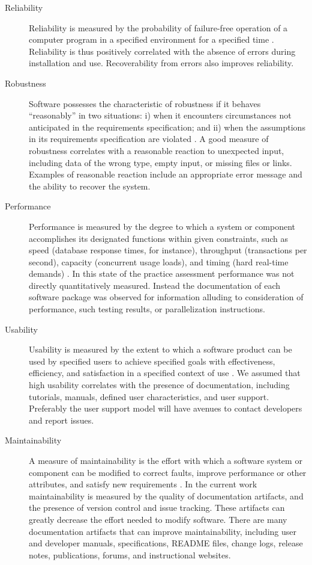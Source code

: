 \documentclass[final, 3p, times, authoryear]{elsarticle}
\begin{document}
\begin{description}
	\item[Reliability] Reliability is measured by the probability of
	failure-free operation of a computer program in a specified environment for
	a specified time \citep{GhezziEtAl2003, musa1987software}. Reliability is
	thus positively correlated with the absence of errors during installation
	and use. Recoverability from errors also improves reliability.
	
	\item[Robustness] Software possesses the characteristic of robustness if it
	behaves ``reasonably'' in two situations: i) when it encounters
	circumstances not anticipated in the requirements specification; and ii)
	when the assumptions in its requirements specification are violated
	\citep{boehm2007software, ghezzi1991fundamentals}. A good measure of
	robustness correlates with a reasonable reaction to unexpected input,
	including data of the wrong type, empty input, or missing files or links.
	Examples of reasonable reaction include an appropriate error message and the
	ability to recover the system.
	
	\item[Performance] Performance is measured by the degree to which a system
	or component accomplishes its designated functions within given constraints,
	such as speed (database response times, for instance), throughput
	(transactions per second), capacity (concurrent usage loads), and timing
	(hard real-time demands) \citep{IEEEStdGlossarySET1990, wiegers2003softreq}.
	In this state of the practice assessment performance was not directly
	quantitatively measured. Instead the documentation of each software package
	was observed for information alluding to consideration of performance, such
	testing results, or parallelization instructions. 
	
	\item[Usability] Usability is measured by the extent to which a software
	product can be used by specified users to achieve specified goals with
	effectiveness, efficiency, and satisfaction in a specified context of use
	\citep{nielsonusability}. We assumed that high usability correlates with
	the presence of documentation, including tutorials, manuals, defined
	user characteristics, and user support. Preferably the user support model
	will have avenues to contact developers and report issues.
	
	\item[Maintainability] A measure of maintainability is the effort with which
	a software system or component can be modified to correct faults, improve
	performance or other attributes, and satisfy new requirements
	\citep{IEEEStdGlossarySET1990, boehm2007software}. In the current work
	maintainability is measured by the quality of documentation artifacts, and
	the presence of version control and issue tracking. These artifacts can
	greatly decrease the effort needed to modify software. There are many
	documentation artifacts that can improve maintainability, including user and
	developer manuals, specifications, README files, change logs, release notes,
	publications, forums, and instructional websites. 


\end{description}
\end{document}
